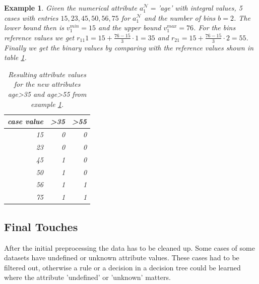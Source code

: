\documentclass[a4paper,preprint]{sig-alternate-xt}
\newtheorem{exmp}{Example}[section]
\begin{document}
\begin{exmp}
\label{exmp:numeric}
Given the numerical attribute $a^\mathcal{N}_1=$'age' with integral values, 5 cases with entries $15, 23, 45, 50, 56, 75$  for $a^\mathcal{N}_1$ and the number of bins $b=2$.
The lower bound then is $v^{min}_1 = 15$ and the upper bound $v^{max}_1 = 76$.
For the bins reference values we get $r_{11}1 = 15 + \frac{76-15}{3}\cdot1 = 35$ and $r_{21} = 15 + \frac{76-15}{3}\cdot2 = 55$.
Finally we get the binary values by comparing with the reference values shown in table \ref{table:numeric}.
\begin{table}[h]
\centering
\begin{tabular}{r|rr}
\multicolumn{1}{c|}{case value} & \multicolumn{1}{c}{\textgreater{}35} & \multicolumn{1}{c}{\textgreater{}55} \\ \hline
15                              & 0                                    & 0                                    \\
23                              & 0                                    & 0                                    \\
45                              & 1                                    & 0                                    \\
50                              & 1                                    & 0                                    \\
56                              & 1                                    & 1                                    \\
75                              & 1                                    & 1                                   
\end{tabular}
\caption{Resulting attribute values for the new attributes age>35 and age>55 from example \ref{exmp:numeric}.}
\label{table:numeric}
\end{table}
\end{exmp}

\subsection{Final Touches}
\label{subsec:touches}
After the initial preprocessing the data has to be cleaned up.
Some cases of some datasets have undefined or unknown attribute values.
These cases had to be filtered out, otherwise a rule or a decision in a decision tree could be learned where the attribute 'undefined' or 'unknown' matters.
\end{document}
